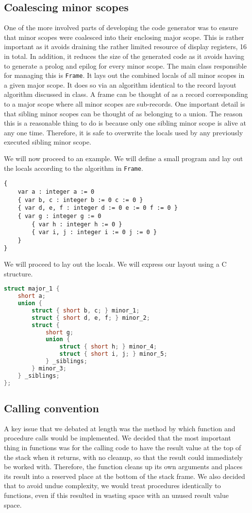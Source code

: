 \documentclass[oneside]{amsart}
\theoremstyle{definition}
\theoremstyle{remark}
\numberwithin{equation}{section}
\begin{document}
\subsection{Coalescing minor scopes}
One of the more involved parts of developing the code generator was to ensure that minor scopes were
coalesced into their enclosing major scope. This is rather important as it avoids draining the
rather limited resource of display registers, 16 in total. In addition, it reduces the size of the
generated code as it avoids having to generate a prolog and epilog for every minor scope. The main
class responsible for managing this is \texttt{Frame}. It lays out the combined locals of all minor
scopes in a given major scope. It does so via an algorithm identical to the record layout algorithm
discussed in class. A frame can be thought of as a record corresponding to a major scope where all
minor scopes are sub-records. One important detail is that sibling minor scopes can be thought of as
belonging to a union. The reason this is a reasonable thing to do is because only one sibling minor
scope is alive at any one time. Therefore, it is safe to overwrite the locals used by any previously
executed sibling minor scope.

We will now proceed to an example. We will define a small program and lay out the locals according
to the algorithm in \texttt{Frame}.
\begin{lstlisting}[caption=Major scope in 488]
{
    var a : integer a := 0
    { var b, c : integer b := 0 c := 0 }
    { var d, e, f : integer d := 0 e := 0 f := 0 }
    { var g : integer g := 0
        { var h : integer h := 0 }
        { var i, j : integer i := 0 j := 0 }
    }
}
\end{lstlisting}

\noindent We will proceed to lay out the locals. We will express our layout using a C structure.
\begin{lstlisting}[caption=Layout as C structure, language=C, directivestyle={\color{black}} emph={short}, emphstyle={\color{blue}}]
struct major_1 {
    short a;
    union {
        struct { short b, c; } minor_1;
        struct { short d, e, f; } minor_2;
        struct {
            short g;
            union {
                struct { short h; } minor_4;
                struct { short i, j; } minor_5;
            } _siblings;
        } minor_3;
    } _siblings;
};
\end{lstlisting}

\subsection{Calling convention}
A key issue that we debated at length was the method by which function and procedure calls would be
implemented. We decided that the most important thing in functions was for the calling code  to have
the result value at the top of the stack when it returns, with no cleanup, so that the result could
immediately be worked with. Therefore, the function cleans up its own arguments and places its
result into a reserved place at the bottom of the stack frame. We also decided that to avoid undue
complexity, we would treat procedures identically to functions, even if this resulted in wasting
space with an unused result value space.
\end{document}

